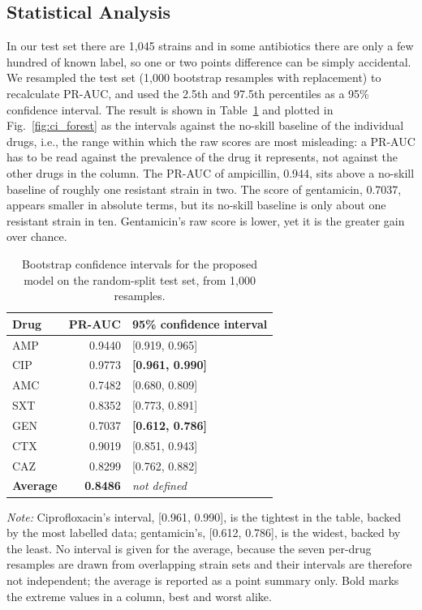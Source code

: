 \documentclass[journal]{IEEEtran}
\begin{document}
\subsection{Statistical Analysis}
\label{sec:statanalysis}

In our test set there are 1{,}045 strains and in some antibiotics there are only a
few hundred of known label, so one or two points difference can be simply accidental.
We resampled the test set (1{,}000 bootstrap resamples with replacement) to
recalculate PR-AUC, and used the 2.5th and 97.5th percentiles as a 95\% confidence
interval. The result is shown in Table~\ref{tab:ci} and plotted in
Fig.~\ref{fig:ci_forest} as the intervals against the no-skill baseline of the
individual drugs, i.e., the range within which the raw scores are most misleading: a
PR-AUC has to be read against the prevalence of the drug it represents, not against
the other drugs in the column. The PR-AUC of ampicillin, 0.944, sits above a no-skill
baseline of roughly one resistant strain in two. The score of gentamicin, 0.7037,
appears smaller in absolute terms, but its no-skill baseline is only about one
resistant strain in ten. Gentamicin's raw score is lower, yet it is the greater gain
over chance.

\begin{table}[!tb]
\caption{Bootstrap confidence intervals for the proposed model on the random-split
test set, from 1{,}000 resamples.}
\label{tab:ci}
\centering
\small
\setlength{\tabcolsep}{4pt}
\renewcommand{\arraystretch}{1.05}
\begin{tabular}{|l|r|l|}
\hline
\rowcolor{headgrey}
\textbf{Drug} & \textbf{PR-AUC} & \textbf{95\% confidence interval} \\ \hline
AMP & 0.9440 & [0.919, 0.965] \\ \hline
CIP & 0.9773 & \textbf{[0.961, 0.990]} \\ \hline
AMC & 0.7482 & [0.680, 0.809] \\ \hline
SXT & 0.8352 & [0.773, 0.891] \\ \hline
GEN & 0.7037 & \textbf{[0.612, 0.786]} \\ \hline
CTX & 0.9019 & [0.851, 0.943] \\ \hline
CAZ & 0.8299 & [0.762, 0.882] \\ \hline
\rowcolor{oursblue}
\textbf{Average} & \textbf{0.8486} & \textit{not defined} \\ \hline
\end{tabular}
\renewcommand{\arraystretch}{1.0}
\vspace{0.4em}

\noindent\footnotesize\textit{Note:} Ciprofloxacin's interval, [0.961, 0.990], is the tightest in
the table, backed by the most labelled data; gentamicin's, [0.612, 0.786], is the widest,
backed by the least. No interval is given for the average, because the seven per-drug
resamples are drawn from overlapping strain sets and their intervals are therefore not
independent; the average is reported as a point summary only. Bold marks the extreme
values in a column, best and worst alike.
\end{table}
\end{document}
